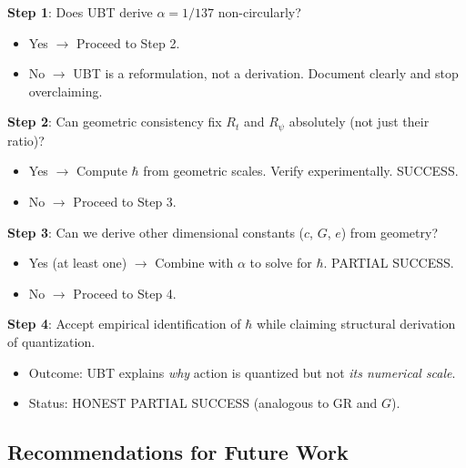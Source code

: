 \documentclass[12pt]{article}
\begin{document}
\begin{center}
\begin{minipage}{0.9\textwidth}
\textbf{Step 1}: Does UBT derive $\alpha = 1/137$ non-circularly?
\begin{itemize}
\item Yes $\to$ Proceed to Step 2.
\item No $\to$ UBT is a reformulation, not a derivation. Document clearly and stop overclaiming.
\end{itemize}

\textbf{Step 2}: Can geometric consistency fix $R_t$ and $R_\psi$ absolutely (not just their ratio)?
\begin{itemize}
\item Yes $\to$ Compute $\hbar$ from geometric scales. Verify experimentally. SUCCESS.
\item No $\to$ Proceed to Step 3.
\end{itemize}

\textbf{Step 3}: Can we derive other dimensional constants ($c$, $G$, $e$) from geometry?
\begin{itemize}
\item Yes (at least one) $\to$ Combine with $\alpha$ to solve for $\hbar$. PARTIAL SUCCESS.
\item No $\to$ Proceed to Step 4.
\end{itemize}

\textbf{Step 4}: Accept empirical identification of $\hbar$ while claiming structural derivation of quantization.
\begin{itemize}
\item Outcome: UBT explains \emph{why} action is quantized but not \emph{its numerical scale}.
\item Status: HONEST PARTIAL SUCCESS (analogous to GR and $G$).
\end{itemize}
\end{minipage}
\end{center}

\subsection{Recommendations for Future Work}
\end{document}
